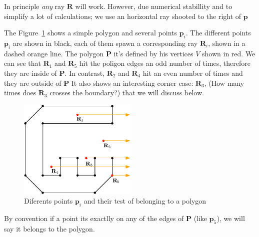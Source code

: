 In principle \emph{any} ray $\mathbf{R}$ will work.
However, due numerical stabillity and to simplify a lot of calculations; we use an horizontal ray shooted to the right of $\mathbf{p}$

The Figure~\ref{fig:polygonTest} shows a simple polygon and several points $\mathbf{p}_i$.
The different points $\mathbf{p}_i$ are shown in black, each of them spawn a corresponding ray $\mathbf{R}_i$, shown in a dashed orange line.
The polygon $\mathbf{P}$ it's defined by his vertices $V$ shown in red.
We can see that $\mathbf{R}_1$ and $\mathbf{R}_5$ hit the poligon edges an odd number of times, therefore they are inside of $\mathbf{P}$.
In contrast, $\mathbf{R}_2$ and $\mathbf{R}_4$ hit an even number of times and they are outside of $\mathbf{P}$
It also shows an interesting corner case: $\mathbf{R}_3$, (How many times does $\mathbf{R}_3$ crosses the boundary?) that we will discuss below.

\begin{figure}[htb]
  \centering
  \includegraphics[width=0.50\textwidth]{img/polygonTest}
  \caption{Diferents points $\mathbf{p}_i$ and their test of belonging to a polygon}
  \label{fig:polygonTest}
\end{figure}

By convention if a point its exactlly on any of the edges of $\mathbf{P}$ (like $\mathbf{p}_5$), we will say it belongs to the polygon.



